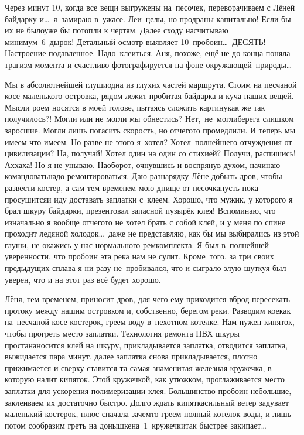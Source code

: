 Через минут 10, когда все вещи выгружены на~песочек, переворачиваем с Лёней байдарку и\ldots~я~замираю в~ужасе. Леи~целы, но продраны капитально! Если бы их не было\mdash уже бы потопли к чертям. Далее сходу насчитываю минимум~6~дырок! Детальный осмотр выявляет 10~пробоин\ldots~ДЕСЯТЬ! Настроение подавленное. Надо~клеиться. Аня, похоже, ещё не до конца поняла трагизм момента и счастливо фотографируется на фоне окружающей~природы\ldots~

Мы в абсолютнейшей глуши\mdash одна из глухих частей маршрута. Стоим на песчаной косе маленького островка, рядом лежит пробитая байдарка и куча наших вещей. Мысли роем носятся в моей голове, пытаясь сложить картину\mdash как же так получилось?! Могли или не могли мы обнестись? Нет,~не~могли\mdash берега слишком заросшие. Могли лишь погасить скорость, но отчего\sdash то промедлили. И теперь мы имеем что имеем. Но разве не этого я~хотел? Хотел~полнейшего отчуждения от цивилизации? На, получай! Хотел один на один со стихией? Получи, распишись! Ах\sdash ха\sdash ха! Но я не унываю. Наоборот, очнувшись и воспрянув духом, начинаю командовать\mdash надо ремонтироваться. 
\newpage
Даю разнарядку Лёне добыть дров, чтобы развести костер, а сам тем временем мою днище от песочка\mdash пусть пока просушится\mdash и иду доставать заплатки с~клеем. Хорошо, что мужик, у которого я брал шкуру байдарки, презентовал запасной пузырёк клея! Вспоминаю, что изначально я вообще отчего\sdash то не хотел брать с собой клей, и у меня по спине проходит ледяной холодок\ldots~даже не представляю, как бы мы выбирались из этой глуши, не окажись у нас нормального ремкомплекта. Я был в~полнейшей уверенности, что пробоин эта река нам не сулит. Кроме~того, за три своих предыдущих сплава я ни разу не~пробивался, что и сыграло злую шутку\mdash я был уверен, что и на этот раз всё будет хорошо.

Лёня, тем временем, приносит дров, для чего ему приходится вброд пересекать протоку между нашим островком и, собственно, берегом реки. Разводим кое\sdash как на~песчаной косе костерок, греем воду в~пехотном котелке. Нам нужен кипяток, чтобы прогреть место заплатки. Технология ремонта ПВХ шкуры проста\mdash наносится клей на шкуру, прикладывается заплатка, отводится заплатка, выжидается пара минут, далее заплатка снова прикладывается, плотно прижимается и сверху ставится та самая знаменитая железная кружечка, в которую налит кипяток. Этой кружечкой, как утюжком, проглаживается место заплатки для ускорения полимеризации клея. Большинство пробоин небольшие, заклеиваем их достаточно быстро. Долго ждать кипятка\mdash сильный ветер задувает маленький костерок, плюс сначала зачем\sdash то греем полный котелок воды, и лишь потом сообразим греть на донышке\mdash на~1~кружечки\mdash так быстрее закипает\ldots~

